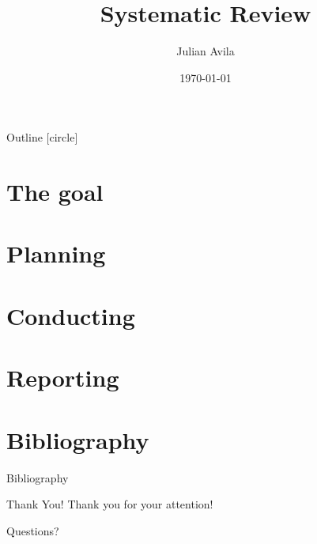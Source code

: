 \documentclass[aspectratio=169,sn-mathphys-num]{beamer}
\title{Systematic Review}
\author{Julian Avila}
\institute{Universidad Distrital Francisco José de Caldas}
\date{\today}
\begin{document}
\begin{frame}
	\titlepage
\end{frame}

\begin{frame}{Outline}
	[circle]
	\tableofcontents
\end{frame}

\section{The goal}


\section{Planning}


\section{Conducting}


\section{Reporting}


\section{Bibliography}
\begin{frame}[allowframebreaks]{Bibliography}
	\printbibliography
\end{frame}

\begin{frame}{Thank You!}
	\centering
	{\LARGE Thank you for your attention!}
	\vspace{0.5cm}

	\Large Questions?
\end{frame}
\end{document}
